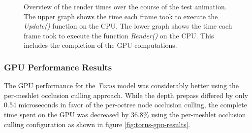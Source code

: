 \begin{figure}[!htb]              %
  \begin{center}
    \caption{Overview of the render times over the course of the test animation. The upper graph shows the time 
    each frame took to execute the \emph{Update()} function on the \ac{CPU}. The lower graph shows the time each 
    frame took to execute the function \emph{Render()} on the \ac{CPU}. This includes the completion of the 
    \ac{GPU} computations.}
    \label{plt:torus-256-culling-cpu-time}
  \end{center}
\end{figure}

\subsubsection*{GPU Performance Results} \label{subsubsec-gpu-performance-results-torus}

The \ac{GPU} performance for the \emph{Torus} model was considerably better using the per-meshlet 
occlusion culling approach. While the depth prepass differed by only 0.54 microseconds in favor of the 
per-octree node occlusion culling, the complete time spent on the \ac{GPU} was decreased by $36.8\%$ 
using the per-meshlet occlusion culling configuration as shown in figure \ref{fig:torus-gpu-results}.

